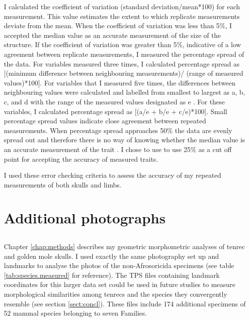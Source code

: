 	I calculated the coefficient of variation (standard deviation/mean*100) for each measurement. This value estimates the extent to which replicate measurements deviate from the mean. When the coefficient of variation was less than 5\%, I accepted the median value as an accurate measurement of the size of the structure. 
	If the coefficient of variation was greater than 5\%, indicative of a low agreement between replicate measurements, I measured the percentage spread of the data. For variables measured three times, I calculated percentage spread as [(minimum difference between neighbouring measurements)/ (range of measured values)*100].
	For variables that I measured five times, the differences between neighbouring values were calculated and labelled from smallest to largest as a, b, c, and d with the range of the measured values designated as e \citep[see][for a full explanation]{Cooper2009}. For these variables, I calculated percentage spread as [(a/e + b/e + c/e)*100]. 
	Small percentage spread values indicate close agreement between repeated measurements. When percentage spread approaches 50\% the data are evenly spread out and therefore there is no way of knowing whether the median value is an accurate measurement of the trait \citep{Cooper2009}. I chose to use to use 25\% as a cut off point for accepting the accuracy of measured traits.

	I used these error checking criteria to assess the accuracy of my repeated measurements of both skulls and limbs. 

\section{Additional photographs}
	\subsection{}
	Chapter \ref{chap:methods} describes my geometric morphometric analyses of tenrec and golden mole skulls. I used exactly the same photography set up and landmarks to analyse the photos of the non-Afrosoricida specimens (see table \ref{tab:species.measured} for reference). The TPS files containing landmark coordinates for this larger data set could be used in future studies to measure morphological similarities among tenrecs and the species they convergently resemble (see section \ref{sect:concl}). These files include 174 additional specimens of 52 mammal species belonging to seven Families.
		
